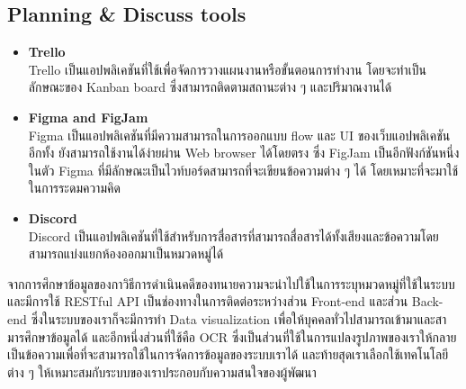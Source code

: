 \documentclass[12pt,oneside,openright,a4paper]{cpe-thai-project}
\begin{document}
\subsection{Planning \& Discuss tools}
\begin{itemize}
\item \textbf{Trello} \\
\hspace*{1cm} Trello เป็นแอปพลิเคชันที่ใช้เพื่อจัดการวางแผนงานหรือขั้นตอนการทำงาน โดยจะทำเป็นลักษณะของ Kanban board ซึ่งสามารถติดตามสถานะต่าง ๆ และปริมาณงานได้ \cite{WhatIsTrello}
\item \textbf{Figma and FigJam} \\
\hspace*{1cm} Figma เป็นแอปพลิเคชันที่มีความสามารถในการออกแบบ flow และ UI ของเว็บแอปพลิเคชันอีกทั้ง ยังสามารถใช้งานได้ง่ายผ่าน Web browser ได้โดยตรง ซึ่ง FigJam เป็นอีกฟังก์ชันหนึ่งในตัว Figma ที่มีลักษณะเป็นไวท์บอร์ดสามารถที่จะเขียนข้อความต่าง ๆ ได้ โดยเหมาะที่จะมาใช้ในการระดมความคิด \cite{WhatIsFigma}
\item \textbf{Discord} \\
\hspace*{1cm} Discord เป็นแอปพลิเคชันที่ใช้สำหรับการสื่อสารที่สามารถสื่อสารได้ทั้งเสียงและข้อความโดยสามารถแบ่งแยกห้องออกมาเป็นหมวดหมู่ได้ \cite{WhatIsDiscord}
\end{itemize}

\hspace*{1cm}  จากการศึกษาข้อมูลของกาวิธีการดำเนินคดีของทนายความจะนำไปใช้ในการระบุหมวดหมู่ที่ใช้ในระบบและมีการใช้ RESTful API เป็นช่องทางในการติดต่อระหว่างส่วน Front-end และส่วน Back-end ซึ่งในระบบของเราก็จะมีการทำ Data visualization เพื่อให้บุคคลทั่วไปสามารถเข้ามาและสามารศึกษาข้อมูลได้ และอีกหนึ่งส่วนที่ใช้คือ OCR ซึ่งเป็นส่วนที่ใช้ในการแปลงรูปภาพของเราให้กลายเป็นข้อความเพื่อที่จะสามารถใช้ในการจัดการข้อมูลของระบบเราได้ และท้ายสุดเราเลือกใช้เทคโนโลยีต่าง ๆ ให้เหมาะสมกับระบบของเราประกอบกับความสนใจของผู้พัฒนา\\


\end{document}
